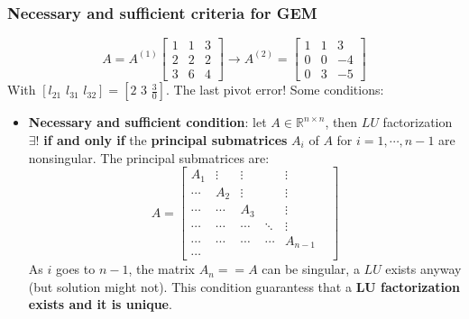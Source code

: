 \subsubsection{Necessary and sufficient criteria for GEM}
$$
A=A^{(1)}\begin{bmatrix}
    1 & 1 & 3\\
    2 & 2 & 2\\
    3 & 6 & 4
\end{bmatrix}\rightarrow
A^{(2)}=\begin{bmatrix}
    1 & 1 & 3\\
    0 & 0 & -4\\
    0 & 3 & -5
\end{bmatrix}
$$
With $\left[l_{21}\,\,l_{31}\,\,l_{32}\right]=[2\,\,3\,\,\frac{3}{0}]$. The last pivot error! Some conditions:
\begin{itemize}
    \item \textbf{Necessary and sufficient condition}: let $A\in\mathbb{R}^{n\times n}$, then $LU$ factorization $\exists!$ \textbf{if and only if} the \textbf{principal submatrices} $A_i$ of $A$ for $i=1,\cdots,n-1$ are nonsingular. The principal submatrices are:
    $$
    A=\begin{bmatrix}
        A_1    & \vdots & \vdots & & \vdots & \\
        \cdots & A_2    & \vdots & & \vdots & \\
        \cdots & \cdots & A_3    & & \vdots & \\
        \cdots & \cdots & \cdots & \ddots & \vdots & \\
        \cdots & \cdots & \cdots & \cdots & A_{n-1}& \\
        \cdots
    \end{bmatrix}
    $$
    As $i$ goes to $n-1$, the matrix $A_n==A$ can be singular, a $LU$ exists anyway (but solution might not). This condition guarantess that a \textbf{LU factorization exists and it is unique}.


\end{itemize}
